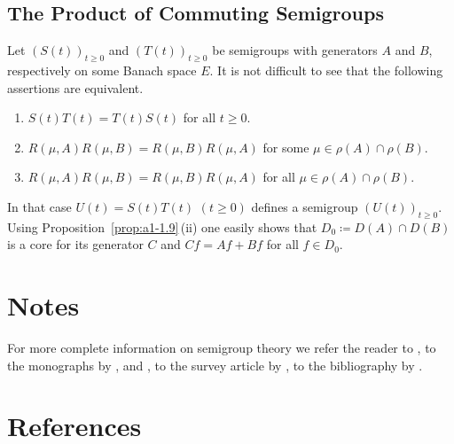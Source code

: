 \subsection{The Product of Commuting Semigroups}\label{subsec:a1-3.9}%
Let $(S(t))_{t\geq 0}$ and $(T(t))_{t\geq 0}$ be semigroups with generators $A$ and $B$, respectively on some Banach space $E$.
It is not difficult to see that the following assertions are equivalent.
\begin{enumerate}[\upshape (a)]

\item  
$S(t)T(t) = T(t)S(t)$ for all $t \geq 0$.

\item 
$R(\mu,A)R(\mu,B) = R(\mu,B)R(\mu,A)$ for some $\mu \in \rho(A) \cap \rho(B)$.

\item 
$R(\mu,A)R(\mu,B) = R(\mu,B)R(\mu,A)$ for all $\mu \in \rho(A) \cap \rho(B)$.

\end{enumerate}
In that case $U(t) = S(t)T(t)$ $(t \geq 0)$ defines a semigroup $(U(t))_{t\geq 0}$.
Using %
Proposition~\ref{prop:a1-1.9}\,(ii) one easily shows that $D_{0} \coloneqq D(A) \cap D(B)$ is a core for its generator $C$ and $Cf = Af + Bf$ for all $f \in D_{0}$.
\section*{Notes}
For more complete information on semigroup theory we refer the reader to \textcite{hillephillips:1957}, to the monographs by \textcite{davies:1980}, 
\textcite{goldstein:1985a} and \textcite{pazy:1983}, to the survey article by \textcite{kreinkhazan:1985}, to the bibliography by 
\textcite{goldstein:1985b}. 
\section*{References}
{\RaggedRight
  \printbibliography[heading=none]
 }
